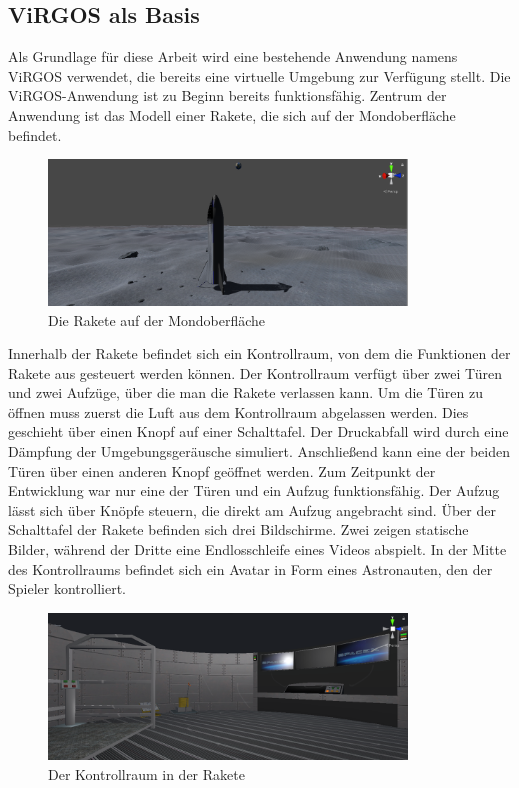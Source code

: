 \subsection{ViRGOS als Basis} \label{Basis}
Als Grundlage für diese Arbeit wird eine bestehende Anwendung namens ViRGOS verwendet, die bereits eine virtuelle Umgebung zur Verfügung stellt. Die ViRGOS-Anwendung ist zu Beginn bereits funktionsfähig. Zentrum der Anwendung ist das Modell einer Rakete, die sich auf der Mondoberfläche befindet. \newline

\begin{figure}[H]
\centering
\includegraphics[width=0.85\textwidth]{VirgosRakete.PNG}
\caption{Die Rakete auf der Mondoberfläche}
\end{figure}

Innerhalb der Rakete befindet sich ein Kontrollraum, von dem die Funktionen der Rakete aus gesteuert werden können. Der Kontrollraum verfügt über zwei Türen und zwei Aufzüge, über die man die Rakete verlassen kann. Um die Türen zu öffnen muss zuerst die Luft aus dem Kontrollraum abgelassen werden. Dies geschieht über einen Knopf auf einer Schalttafel. Der Druckabfall wird durch eine Dämpfung der Umgebungsgeräusche simuliert. Anschließend kann eine der beiden Türen über einen anderen Knopf geöffnet werden. Zum Zeitpunkt der Entwicklung war nur eine der Türen und ein Aufzug funktionsfähig. Der Aufzug lässt sich über Knöpfe steuern, die direkt am Aufzug angebracht sind. Über der Schalttafel der Rakete befinden sich drei Bildschirme. Zwei zeigen statische Bilder, während der Dritte eine Endlosschleife eines Videos abspielt. In der Mitte des Kontrollraums befindet sich ein Avatar in Form eines Astronauten, den der Spieler kontrolliert.\newline

\begin{figure}[H]
\centering
\includegraphics[width=0.85\textwidth]{VirgosKommandozentrale.PNG}
\caption{Der Kontrollraum in der Rakete}
\end{figure}

